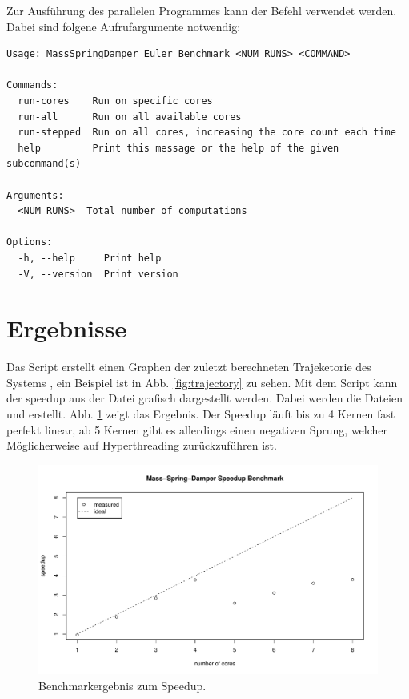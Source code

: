 \documentclass[10pt, a4paper]{article}
\begin{document}
Zur Ausführung des parallelen Programmes kann der Befehl  verwendet werden. Dabei sind folgene Aufrufargumente notwendig:

\begin{verbatim}
Usage: MassSpringDamper_Euler_Benchmark <NUM_RUNS> <COMMAND>

Commands:
  run-cores    Run on specific cores
  run-all      Run on all available cores
  run-stepped  Run on all cores, increasing the core count each time
  help         Print this message or the help of the given subcommand(s)

Arguments:
  <NUM_RUNS>  Total number of computations

Options:
  -h, --help     Print help
  -V, --version  Print version
\end{verbatim}

\section{Ergebnisse}

Das Script  erstellt einen Graphen der zuletzt berechneten Trajeketorie des Systems , ein Beispiel ist in Abb. \ref{fig:trajectory} zu sehen.
Mit dem Script  kann der speedup aus der Datei  grafisch dargestellt werden. Dabei werden die Dateien  und  erstellt. Abb. \ref{fig:speedop} zeigt das Ergebnis. Der Speedup läuft bis zu 4 Kernen fast perfekt linear, ab 5 Kernen gibt es allerdings einen negativen Sprung, welcher Möglicherweise auf Hyperthreading zurückzuführen ist.

\begin{figure}[h]
  \begin{center}
    \includegraphics[width=\textwidth]{graphics/plot_amdahl_speedup_2M.pdf}
  \end{center}
  \caption{Benchmarkergebnis zum Speedup.}\label{fig:speedop}
\end{figure}
\end{document}
